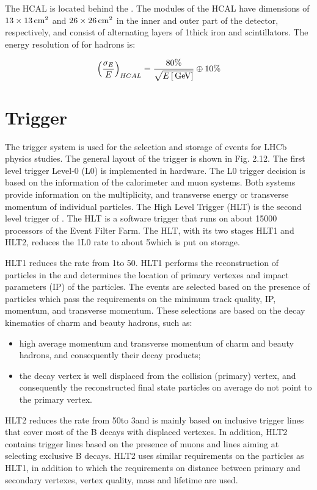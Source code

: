 The HCAL is located behind the \ecal. The modules of the HCAL have dimensions of
$13\times13\rm \,cm^2$ and $26\times26\rm \,cm^2$ in the inner and outer part of the
detector, respectively, and consist of alternating layers of 1\cm thick iron
and scintillators. The energy resolution of \hcal for hadrons is:

\begin{equation}
\left(\frac{\sigma_{E}}{E}\right)_{HCAL} = \frac{80\%}{\sqrt{E\left[\mathrm{\,Ge\kern -0.1em V}\right]}} \oplus 10\%
\label{eqn:ecal}
\end{equation}

\section{Trigger}

The \lhcb trigger system is used for the selection and storage of events for
LHCb physics studies. The general layout of the trigger is shown in Fig. 2.12.
The first level trigger Level-0 (L0) is implemented in hardware. The L0 trigger
decision is based on the information of the calorimeter and muon systems. Both
systems provide information on the multiplicity, and transverse energy \et or
transverse momentum \pt of individual particles. The High Level Trigger (HLT)
is the second level trigger of \lhcb. The HLT is a software trigger that runs on
about 15000 processors of the Event Filter Farm. The HLT, with its two stages
HLT1 and HLT2, reduces the 1\mhz L0 rate to about 5\khz which is put on
storage.

HLT1 reduces the rate from 1\mhz to 50\khz. HLT1 performs the reconstruction
of particles in the \velo and determines the location of primary vertexes and
impact parameters (IP) of the particles. The events are selected based on the
presence of particles which pass the requirements on the minimum track quality,
IP, momentum, and transverse momentum. These selections are based on the decay
kinematics of charm and beauty hadrons, such as:

\begin{itemize}
\item high average momentum and transverse momentum of charm and beauty
hadrons, and consequently their decay products;
\item the decay vertex is well displaced from the collision (primary) vertex, and
consequently the reconstructed final state particles on average do not point
to the primary vertex.
\end{itemize}

HLT2 reduces the rate from 50\khz to 3\khz and is mainly based on inclusive
trigger lines that cover most of the B decays with displaced vertexes. In
addition, HLT2 contains trigger lines based on the presence of muons and lines
aiming at selecting exclusive B decays. HLT2 uses similar requirements on the
particles as HLT1, in addition to which the requirements on distance between
primary and secondary vertexes, vertex quality, mass and lifetime are used.

